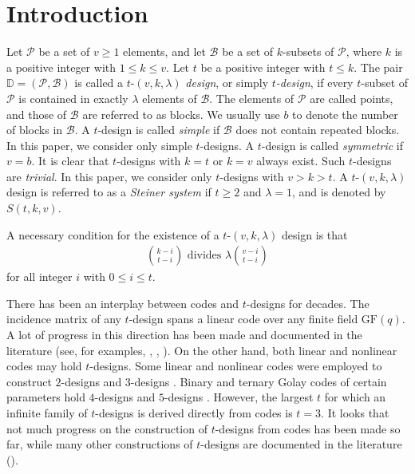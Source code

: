 \documentclass[1p,final]{elsarticle}
\newcommand{\gf}{{\mathrm{GF}}}
\newcommand{\cP}{{\mathcal{P}}}
\newcommand{\cB}{{\mathcal{B}}}
\newcommand{\bD}{{\mathbb{D}}}
\begin{document}
\section{Introduction}

Let $\cP$ be a set of $v \ge 1$ elements, and let $\cB$ be a set of $k$-subsets of $\cP$, where $k$ is
a positive integer with $1 \leq k \leq v$. Let $t$ be a positive integer with $t \leq k$. The pair
$\bD = (\cP, \cB)$ is called a $t$-$(v, k, \lambda)$ {\em design}, or simply {\em $t$-design}, if every $t$-subset of $\cP$ is contained in exactly $\lambda$ elements of
$\cB$. The elements of $\cP$ are called points, and those of $\cB$ are referred to as blocks.
We usually use $b$ to denote the number of blocks in $\cB$.  A $t$-design is called {\em simple} if $\cB$ does not contain repeated blocks. In this paper, we consider only simple 
$t$-designs.  A $t$-design is called {\em symmetric} if $v = b$. It is clear that $t$-designs with $k = t$ or $k = v$ always exist. Such $t$-designs are {\em trivial}. In this paper, we consider only $t$-designs with $v > k > t$.
A $t$-$(v,k,\lambda)$ design is referred to as a {\em Steiner system} if $t \geq 2$ and $\lambda=1$, and is denoted by $S(t,k, v)$.

A necessary condition for the existence of a $t$-$(v, k, \lambda)$ design is that
\begin{eqnarray}\label{eqn-tdesignnecessty}
\binom{k-i}{t-i} \mbox{ divides } \lambda \binom{v-i}{t-i}
\end{eqnarray}
for all integer $i$ with $0 \leq i \leq t$.

There has been an interplay between codes and $t$-designs for decades. The incidence 
matrix of any $t$-design spans a linear code over any finite field $\gf(q)$. A lot of 
progress in this direction has been made and documented in the literature (see, for 
examples, \cite{AK92}, \cite{DingBook}, \cite{Tonchev,Tonchevhb}). On the other hand, 
both linear and nonlinear codes may hold $t$-designs. Some linear and nonlinear codes 
were employed to construct $2$-designs and $3$-designs \cite{AK92,Tonchev,Tonchevhb}. 
Binary and ternary Golay codes of certain parameters hold $4$-designs and $5$-designs \cite{AK92}. However, the largest 
$t$ for which an infinite family of $t$-designs is derived directly from codes is $t=3$. 
It looks that not much progress on the construction of $t$-designs from codes has 
been made so far, while many other constructions of $t$-designs are documented in the 
literature (\cite{BJL,CMhb,KLhb,RR10}).    
\end{document}
